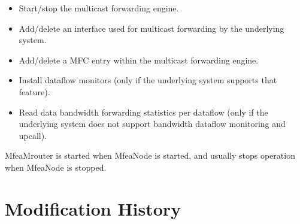\documentclass[11pt]{article}
\begin{document}
\begin{itemize}

  \item Start/stop the multicast forwarding engine.

  \item Add/delete an interface used for multicast forwarding by the
  underlying system.

  \item Add/delete a MFC entry within the multicast forwarding engine.

  \item Install dataflow monitors (only if the underlying system supports
  that feature).

  \item Read data bandwidth forwarding statistics per dataflow (only if
  the underlying system does not support bandwidth dataflow monitoring
  and upcall).

\end{itemize}

MfeaMrouter is started when MfeaNode is started, and usually stops
operation when MfeaNode is stopped.


\appendix
\section{Modification History}
\end{document}
